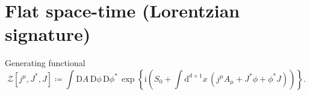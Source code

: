\documentclass[12pt]{article}
\newcommand\mi{\mathrm{i}} %
\newcommand\dif{\mathrm{d}}
\newcommand\Dif{\mathrm{D}}
\newcommand{\rbr}[1]{{\left(#1\right)}}
\newcommand{\sfun}[2]{{#1}\mathopen{}\left[#2\right]\mathclose{}}
\newcommand{\cfun}[2]{{#1}\mathopen{}\left\{#2\right\}\mathclose{}}
\begin{document}

\cite{Dunne2005}




\section{Flat space-time (Lorentzian signature)}




Generating functional
\begin{equation}
\sfun{\mathcal{Z}}{j^\mu, J^*, J} \coloneqq
\int\Dif A\,\Dif\phi\,\Dif\phi^*\,\cfun{\exp}{\mi\rbr{S_0
+\int\dif^{d+1} x\,\rbr{j^\mu A_\mu + J^* \phi+\phi^* J}}}.
\end{equation}
\end{document}
